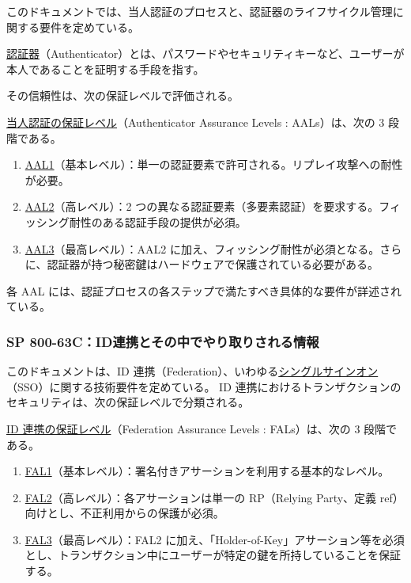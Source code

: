 \documentclass[uplatex]{jsarticle}
\def\ref#1{ref}%
\def\label#1{}%
\begin{document}
このドキュメントでは、当人認証のプロセスと、認証器のライフサイクル管理に関する要件を定めている。

\begin{dfn}[認証器]\label{dfn:ch5-authenticator}
\underline{認証器}（Authenticator）とは、パスワードやセキュリティキーなど、ユーザーが本人であることを証明する手段を指す。
\end{dfn}

その信頼性は、次の保証レベルで評価される。

\begin{dfn}\label{dfn:aal}
\underline{当人認証の保証レベル}（Authenticator Assurance Levels : AALs）は、次の 3 段階である。
\begin{enumerate}
\item \underline{AAL1}（基本レベル）：単一の認証要素で許可される。リプレイ攻撃への耐性が必要。
\item \underline{AAL2}（高レベル）：2 つの異なる認証要素（多要素認証）を要求する。フィッシング耐性のある認証手段の提供が必須。
\item \underline{AAL3}（最高レベル）：AAL2 に加え、フィッシング耐性が必須となる。さらに、認証器が持つ秘密鍵はハードウェアで保護されている必要がある。
\end{enumerate}
\end{dfn}

各 AAL には、認証プロセスの各ステップで満たすべき具体的な要件が詳述されている。

\subsubsection{SP 800-63C：ID連携とその中でやり取りされる情報}

このドキュメントは、ID 連携（Federation）、いわゆる\underline{シングルサインオン}（SSO）に関する技術要件を定めている。
ID 連携におけるトランザクションのセキュリティは、次の保証レベルで分類される。

\begin{dfn}\label{dfn:fal}
\underline{ID 連携の保証レベル}（Federation Assurance Levels : FALs）は、次の 3 段階である。
\begin{enumerate}
\item \underline{FAL1}（基本レベル）：署名付きアサーションを利用する基本的なレベル。
\item \underline{FAL2}（高レベル）：各アサーションは単一の RP（Relying Party、定義 \ref{dfn:rp}）向けとし、不正利用からの保護が必須。
\item \underline{FAL3}（最高レベル）：FAL2 に加え、「Holder-of-Key」アサーション等を必須とし、トランザクション中にユーザーが特定の鍵を所持していることを保証する。
\end{enumerate}
\end{dfn}
\end{document}
